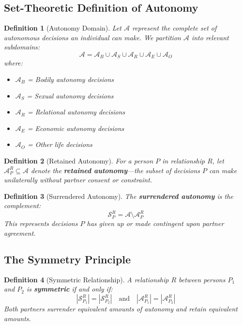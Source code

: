 \documentclass[12pt, letterpaper]{article}
\newtheorem{definition}{Definition}[section]
\begin{document}
\subsection{Set-Theoretic Definition of Autonomy}

\begin{definition}[Autonomy Domain]
Let $\mathcal{A}$ represent the complete set of autonomous decisions an individual can make. We partition $\mathcal{A}$ into relevant subdomains:
\[
\mathcal{A} = \mathcal{A}_B \cup \mathcal{A}_S \cup \mathcal{A}_R \cup \mathcal{A}_E \cup \mathcal{A}_O
\]
where:
\begin{itemize}
    \item $\mathcal{A}_B$ = Bodily autonomy decisions
    \item $\mathcal{A}_S$ = Sexual autonomy decisions
    \item $\mathcal{A}_R$ = Relational autonomy decisions
    \item $\mathcal{A}_E$ = Economic autonomy decisions
    \item $\mathcal{A}_O$ = Other life decisions
\end{itemize}
\end{definition}

\begin{definition}[Retained Autonomy]
For a person $P$ in relationship $R$, let $\mathcal{A}_P^R \subseteq \mathcal{A}$ denote the \textbf{retained autonomy}---the subset of decisions $P$ can make unilaterally without partner consent or constraint.
\end{definition}

\begin{definition}[Surrendered Autonomy]
The \textbf{surrendered autonomy} is the complement:
\[
\mathcal{S}_P^R = \mathcal{A} \setminus \mathcal{A}_P^R
\]
This represents decisions $P$ has given up or made contingent upon partner agreement.
\end{definition}

\subsection{The Symmetry Principle}

\begin{definition}[Symmetric Relationship]
A relationship $R$ between persons $P_1$ and $P_2$ is \textbf{symmetric} if and only if:
\[
|\mathcal{S}_{P_1}^R| = |\mathcal{S}_{P_2}^R| \quad \text{and} \quad |\mathcal{A}_{P_1}^R| = |\mathcal{A}_{P_2}^R|
\]
Both partners surrender equivalent amounts of autonomy and retain equivalent amounts.
\end{definition}
\end{document}
